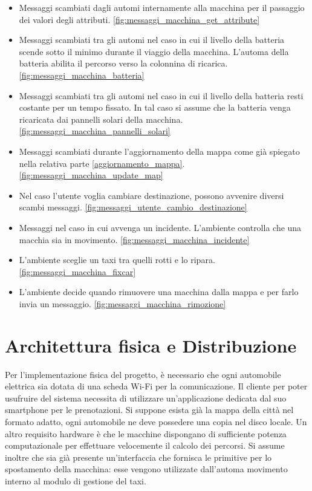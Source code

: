 \begin{itemize}
	\item Messaggi scambiati dagli automi internamente alla macchina per il passaggio dei valori degli attributi. \ref{fig:messaggi_macchina_get_attribute}
	\item Messaggi scambiati tra gli automi nel caso in cui il livello della batteria scende sotto il minimo durante il viaggio della macchina. L'automa della batteria abilita il percorso verso la colonnina di ricarica. \ref{fig:messaggi_macchina_batteria}
	\item Messaggi scambiati tra gli automi nel caso in cui il livello della batteria resti costante per un tempo fissato. In tal caso si assume che la batteria venga ricaricata dai pannelli solari della macchina. \ref{fig:messaggi_macchina_pannelli_solari}
	\item Messaggi scambiati durante l'aggiornamento della mappa come già spiegato nella relativa parte \ref{aggiornamento_mappa}. \ref{fig:messaggi_macchina_update_map}
	\item Nel caso l'utente voglia cambiare destinazione, possono avvenire diversi scambi messaggi. \ref{fig:messaggi_utente_cambio_destinazione}
	\item Messaggi nel caso in cui avvenga un incidente. L'ambiente controlla che una macchia sia in movimento. \ref{fig:messaggi_macchina_incidente}
	\item L'ambiente sceglie un taxi tra quelli rotti e lo ripara. \ref{fig:messaggi_macchina_fixcar}
	\item L'ambiente decide quando rimuovere una macchina dalla mappa e per farlo invia un messaggio. \ref{fig:messaggi_macchina_rimozione}
\end{itemize}

\newpage

\section{Architettura fisica e Distribuzione} \label{arch_fisica}
Per l'implementazione fisica del progetto, è necessario che ogni automobile elettrica sia dotata di una scheda Wi-Fi per la comunicazione. Il cliente per poter usufruire del sistema necessita di utilizzare un'applicazione dedicata dal suo smartphone per le prenotazioni. Si suppone esista già la mappa della città nel formato adatto, ogni automobile ne deve possedere una copia nel disco locale. Un altro requisito hardware è che le macchine dispongano di sufficiente potenza computazionale per effettuare velocemente il calcolo dei percorsi. Si assume inoltre che sia già presente un'interfaccia che fornisca le primitive per lo spostamento della macchina: esse vengono utilizzate dall'automa movimento interno al modulo di gestione del taxi.

